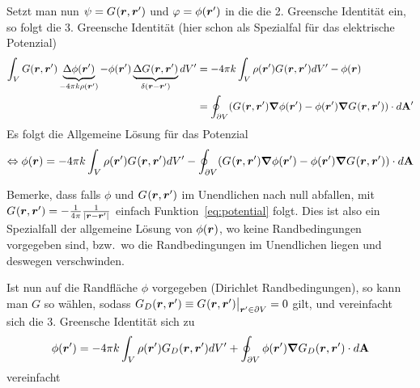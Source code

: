 Setzt man nun $\psi=\green$ und $\varphi=\phi(\vr')$ in die die 2.
Greensche Identität ein, so folgt die 3. Greensche Identität (hier schon
als Spezialfal für das elektrische Potenzial)
\begin{equation}
  \begin{split}
    \int_V G(\vb*r,\vb*r')\underbrace{\Delta\phi(\vb*r')}_{%
    -4\pi k\rho(\vb*r')} 
    - \phi(\vb*r')\underbrace{\Delta \green}_{\delta(\vb*r - \vb*r')}
    dV'
    &= -4\pi k\int_V \rho(\vb*r') \green dV' -\phi(\vb*r)\\
    &= \oint_{\partial V} (\green\grad\phi(\vr')-\phi(\vr')\grad\green)\ddA'\\
  \end{split}
\end{equation}
Es folgt die Allgemeine Lösung für das Potenzial
\begin{equation*}
  \Leftrightarrow \phi(\vr) = -4\pi k\int_V \rho(\vr')\green dV' 
  - \oint_{\partial V} (\green\grad\phi(\vr')-\phi(\vr')\grad\green)\ddA
\end{equation*}

Bemerke, dass falls $\phi$ und $\green$ im Unendlichen nach null abfallen,
mit $\green=-\frac{1}{4\pi} \frr $ einfach Funktion~\ref{eq:potential} folgt.
Dies ist also ein Spezialfall der allgemeine Lösung von $\phi(\vr)$, wo
keine Randbedingungen vorgegeben sind, bzw.\ wo die Randbedingungen im
Unendlichen liegen und deswegen verschwinden.

Ist nun auf die Randfläche $\phi$ vorgegeben (Dirichlet Randbedingungen), 
so kann man $G$ so wählen, 
sodass $\green[D]\equiv\green\big|_{\vr'\in\partial V}= 0$ gilt, und vereinfacht sich 
die 3. Greensche Identität sich zu
\begin{equation}
  \phi(\vb*r') = -4\pi k\int_V \rho(\vr')\green[D] dV' 
  + \oint_{\partial V} \phi(\vr')\grad\green[D] \ddA
\end{equation}
vereinfacht
